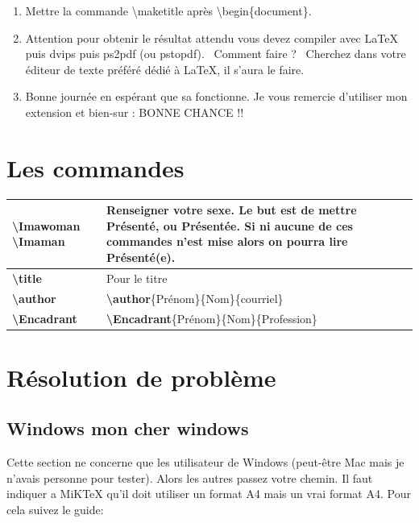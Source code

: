 \documentclass[10pt]{article}
\newcommand{\LOL}[1]{\mbox{\raisebox{1em}{\rotatebox{-90}{:-)}}\raisebox{2em}{\rotatebox{-90}{:-)}}\hspace{-2ex}\rotatebox{-90}{:-)}}~#1~%
\mbox{\raisebox{2em}{\rotatebox{-90}{:-)}}\hspace{-2ex}\rotatebox{-90}{:-)}\raisebox{1em}{\rotatebox{-90}{:-)}}}}
\begin{document}
\begin{enumerate}
 \item  Mettre la commande \mbox{\textbackslash maketitle} apr\`es \mbox{\textbackslash begin\{document\}}.

 \item  Attention pour obtenir le r\'esultat attendu vous devez compiler avec \LaTeX{} puis dvips puis ps2pdf (ou pstopdf).
       \LOL{Comment faire ?} Cherchez dans votre \'editeur de texte pr\'ef\'er\'e d\'edi\'e \`a \LaTeX, il s'aura le faire. 

 \item  Bonne journ\'ee en esp\'erant que sa fonctionne.
   Je vous remercie d'utiliser mon extension et bien-sur :
			BONNE CHANCE !!
\end{enumerate}

\section{Les commandes}

\begin{tabular}{|p{2.5cm}|p{9cm}|}
\hline
  \bf \textbackslash Imawoman \textbackslash Imaman & Renseigner votre sexe. Le but est de mettre
  \textbf{Pr\'esent\'e}, ou \textbf{Pr\'esent\'ee}. Si ni aucune de ces commandes n'est mise alors on pourra lire
  \textbf{Pr\'esent\'e(e)}.\\\hline
  \bf \textbackslash title     & Pour le titre\\\hline
  \bf \textbackslash author    & \textbf{ \textbackslash author}\{Pr\'enom\}\{Nom\}\{courriel\} \\\hline
  \bf \textbackslash Encadrant & \textbf{ \textbackslash Encadrant}\{Pr\'enom\}\{Nom\}\{Profession\} \\\hline
\end{tabular}

\section{R\'esolution de probl\`eme}
\subsection{Windows mon cher windows}

	Cette section ne concerne que les utilisateur de Windows (peut-\^etre Mac mais je n'avais personne pour tester). Alors les autres passez votre chemin.
	Il faut indiquer a MiK\TeX{} qu'il doit utiliser un format A4 mais un vrai format A4.
	Pour cela suivez le guide:
\end{document}
